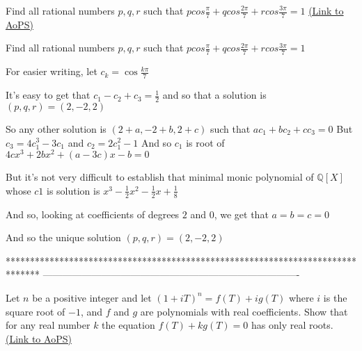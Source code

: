 \begin{problem}
	Find all rational numbers $ p, q, r$ such that
$pcos\frac{\pi}{7}+qcos\frac{2\pi}{7}+rcos\frac{3\pi}{7}=1$
	\flushright \href{https://artofproblemsolving.com/community/c6h488611}{(Link to AoPS)}
\end{problem}



\begin{solution}
	\begin{tcolorbox}Find all rational numbers $ p, q, r$ such that
$pcos\frac{\pi}{7}+qcos\frac{2\pi}{7}+rcos\frac{3\pi}{7}=1$\end{tcolorbox}
For easier writing, let $c_k=\cos\frac{k\pi}7$

It's easy to get that $c_1-c_2+c_3=\frac 12$ and so that a solution is $(p,q,r)=(2,-2,2)$

So any other solution is $(2+a,-2+b,2+c)$ such that $ac_1+bc_2+cc_3=0$
But $c_3=4c_1^3-3c_1$ and $c_2=2c_1^2-1$
And so $c_1$ is root of $4cx^3+2bx^2+(a-3c)x-b=0$

But it's not very difficult to establish that minimal monic polynomial of $\mathbb Q[X]$ whose $c1$ is solution is $x^3-\frac 12x^2-\frac 12x+\frac 18$

And so, looking at coefficients of degrees $2$ and $0$, we get that $a=b=c=0$

And so the unique solution $\boxed{(p,q,r)=(2,-2,2)}$
\end{solution}
*******************************************************************************
-------------------------------------------------------------------------------

\begin{problem}
	Let $n$ be a positive integer and let $(1+iT)^n=f(T)+ig(T)$ where $i$ is the square root of $-1$, and $f$ and $g$ are polynomials with real coefficients. Show that for any real number $k$ the equation $f(T)+kg(T)=0$ has only real roots.
	\flushright \href{https://artofproblemsolving.com/community/c6h488784}{(Link to AoPS)}
\end{problem}



